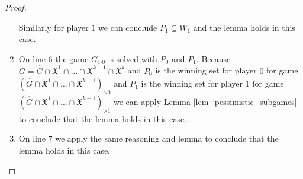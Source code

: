 \begin{lemma}
\begin{proof}
\begin{enumerate}
			Similarly for player $1$ we can conclude $P_1 \subseteq W_1$ and the lemma holds in this case.
			\item On line $6$ the game $G_{\triangleright0}$ is solved with $P_0$ and $P_1$. Because $G = \hat{G} \cap \mathfrak{X}^1 \cap \dots \cap \mathfrak{X}^{k-1} \cap \mathfrak{X}^k$ and $P_0$ is the winning set for player $0$ for game $(\hat{G} \cap \mathfrak{X}^1 \cap \dots \cap \mathfrak{X}^{k-1})_{\triangleright0}$ and $P_1$ is the winning set for player $1$ for game $(\hat{G} \cap \mathfrak{X}^1 \cap \dots \cap \mathfrak{X}^{k-1})_{\triangleright1}$ we can apply Lemma \ref{lem_pessimistic_subgames} to conclude that the lemma holds in this case.
			\item On line $7$ we apply the same reasoning and lemma to conclude that the lemma holds in this case.
		\end{enumerate}
	\end{proof}
\end{lemma}


